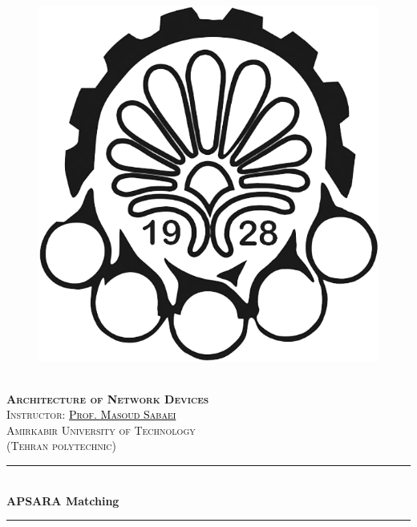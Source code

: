 \documentclass[12pt	]{article}
\newcommand{\HRule}{\rule{\linewidth}{0.5mm}} %
\begin{document}
\begin{center}
    \begin{figure}
        \vspace{-1.0cm}
        \centering
        \includegraphics[scale = 0.35]{Images/AUT_logo.png} %
    \end{figure}
    \mbox{}\\[2.0cm]
    \textsc{\Huge \textbf{Architecture of Network Devices}}\\[1.0cm]
    \textsc{\LARGE Instructor: \href{https://scholar.google.com/citations?user=aIiC_6UAAAAJ&hl=en}{\textcolor{black}{Prof. Masoud Sabaei}}}\\[2.5cm]
    \textsc{\LARGE Amirkabir University of Technology} \\%
    \textsc{(Tehran polytechnic)}
    \HRule\\[0.4cm]
    {\large \bf {\selectfont APSARA Matching} }\\[0.2cm]
    \HRule\\[1.5cm]
\end{center}
\end{document}
